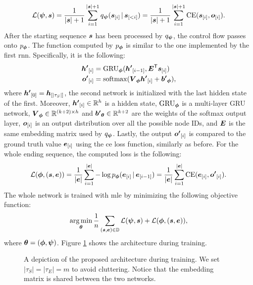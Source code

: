 $$\Loss(\EncParam, \Vector{s}) = \frac{1}{|\Vector{s}|+1} \sum_{i=1}^{|\Vector{s}|+1} q_{\EncParam}(\Elem{s}{i} \given \Elem{s}{<i}) = \frac{1}{|\Vector{s}|+1} \sum_{i=1}^{|\Vector{s}|+1} \mathrm{CE}(\Elem{s}{i}, \Elem{o}{i}).$$
After the starting sequence $\Vector{s}$ has been processed by $q_{\boldsymbol{\psi}}$, the control flow passes onto $p_{\boldsymbol{\phi}}$. The function computed by $p_{\boldsymbol{\phi}}$ is similar to the one implemented by the first \gls{rnn}. Specifically, it is the following:
\begin{align*}
    \Elem{h'}{i} &= \Op{GRU}_{\DecParam}(\Elem{h'}{i-1}, \Matrix{E}^{\Transpose}\Elem{s}{i})\\
    \Elem{o'}{i} &= \softmax(\Matrix{V}_{\DecParam}\Elem{h'}{i} + \Vector{b'}_{\DecParam}),
\end{align*}
where $\Elem{h'}{0} = \Elem{h}{|\tau_S|}$, \ie the second network is initialized with the last hidden state of the first. Moreover, $\Elem{h'}{i} \in \Real^h$ is a hidden state, $\operatorname{GRU}_{\boldsymbol{\phi}}$ is a multi-layer GRU network, $\Matrix{V}_{\DecParam} \in \Real^{(k+2) \times h}$ and $\Vector{b'}_{\Param} \in \Real^{k+2}$ are the weights of the softmax output layer, $\Elem{o}{i}$ is an output distribution over all the possible node IDs, and $\Matrix{E}$ is the same embedding matrix used by $q_{\boldsymbol{\psi}}$.  Lastly, the output $\Elem{o'}{i}$ is compared to the ground truth value $\Elem{e}{i}$ using the \gls{ce} loss function, similarly as before. For the whole ending sequence, the computed loss is the following:
$$\Loss(\DecParam, (\Vector{s}, \Vector{e})) = \frac{1}{|\Vector{e}|} \sum_{i=1}^{|\Vector{e}|} - \log p_{\DecParam}(\Elem{e}{i} \given \Elem{e}{i-1}) = \frac{1}{|\Vector{e}|} \sum_{i=1}^{|\Vector{e}|} \mathrm{CE}(\Elem{e}{i}, \Elem{o'}{i}).$$
The whole network is trained with \gls{mle} by minimizing the following objective function:
$$\argmin_{\Param} \frac{1}{n} \sum_{(\Vector{s},\Vector{e}) \in \Data} \Loss(\EncParam, \Vector{s}) + \Loss(\DecParam, (\Vector{s}, \Vector{e})),$$
where $\boldsymbol{\theta} = (\boldsymbol{\phi}, \boldsymbol{\psi})$. Figure \ref{fig:model-training} shows the architecture during training.

\begin{figure}[h!]
    \centering
    \resizebox{.8\textwidth}{!}{}
    \caption{A depiction of the proposed architecture during training. We set $|\tau_S| = |\tau_E| = m$ to avoid cluttering. Notice that the embedding matrix is shared between the two networks.}
    \label{fig:model-training}
\end{figure}

